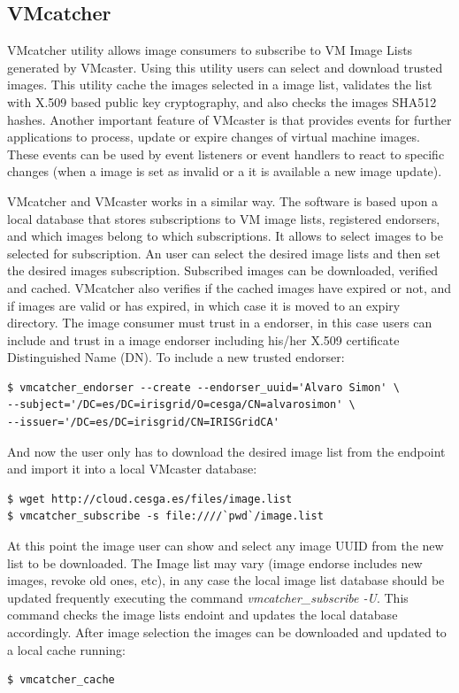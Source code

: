 \documentclass{llncs_Ibergrid2013}
\begin{document}
\subsection{VMcatcher}
VMcatcher utility allows image consumers to subscribe to VM Image Lists generated by VMcaster. 
Using this utility users can select and download trusted images.
This utility cache the images selected in a image list, validates the list with X.509 based public key cryptography, and also checks  the images SHA512 hashes. 
Another important feature of VMcaster is that provides events for further applications to process, update or expire changes of virtual machine images. 
These events can be used by event listeners or event handlers to react to specific changes (when a image is set as invalid or a it is available a new image update). 

VMcatcher and VMcaster works in a similar way. The software is based upon a local database that stores subscriptions to VM image lists, registered endorsers, and which images belong to which subscriptions. 
It allows to select images to be selected for subscription. An user can select the desired image lists and then set the desired images subscription.
Subscribed images can be downloaded, verified and cached. VMcatcher also verifies if the cached images have expired or not, and if images are valid or has expired, in which case it is moved to an expiry directory.
The image consumer must trust in a endorser, in this case users can include and trust in a image endorser including his/her X.509 certificate Distinguished Name (DN).
To include a new trusted endorser:
\begin{verbatim}
$ vmcatcher_endorser --create --endorser_uuid='Alvaro Simon' \
--subject='/DC=es/DC=irisgrid/O=cesga/CN=alvarosimon' \
--issuer='/DC=es/DC=irisgrid/CN=IRISGridCA'
\end{verbatim}
And now the user only has to download the desired image list from the endpoint and import it into a local VMcaster database:
\begin{verbatim}
$ wget http://cloud.cesga.es/files/image.list
$ vmcatcher_subscribe -s file:////`pwd`/image.list
\end{verbatim}
At this point the image user can show and select any image UUID from the new list to be downloaded. 
The Image list may vary (image endorse includes new images, revoke old ones, etc), in any case the local image list database should be updated frequently executing the command \textit{vmcatcher\_subscribe -U}.
This command checks the image lists endoint and updates the local database accordingly.
After image selection the images can be downloaded and updated to a local cache running:
\begin{verbatim}
$ vmcatcher_cache
\end{verbatim}
\end{document}
